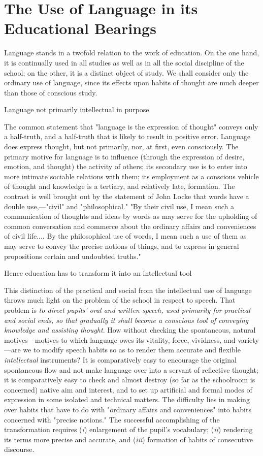 \documentclass[letterpaper]{book}
\begin{document}
\section{The Use of Language in its Educational Bearings}

Language stands in a twofold relation to the work of education. On the
one hand, it is continually used in all studies as well as in all the
social discipline of the school; on the other, it is a distinct object
of study. We shall consider only the ordinary use of language, since its
effects upon habits of thought are much deeper than those of conscious
study.

Language not primarily intellectual in purpose

The common statement that "language is the
expression
of thought" conveys only a half-truth, and a half-truth that is likely
to result in positive error. Language does express thought, but not
primarily, nor, at first, even consciously. The primary motive for
language is to influence (through the expression of desire, emotion, and
thought) the activity of others; its secondary use is to enter into more
intimate sociable relations with them; its employment as a conscious
vehicle of thought and knowledge is a tertiary, and relatively late,
formation. The contrast is well brought out by the statement of John
Locke that words have a double use,---"civil" and "philosophical." "By
their civil use, I mean such a communication of thoughts and ideas by
words as may serve for the upholding of common conversation and commerce
about the ordinary affairs and conveniences of civil life.... By the
philosophical use of words, I mean such a use of them as may serve to
convey the precise notions of things, and to express in general
propositions certain and undoubted truths."

Hence education has to transform it into an intellectual tool

This distinction of the practical and social from the intellectual use
of language throws much light on the problem of the school in respect to
speech. That problem is \emph{to direct pupils' oral and written speech,
used primarily for practical and social ends, so that gradually it shall
become a conscious tool of conveying knowledge and assisting thought}.
How without checking the spontaneous, natural motives---motives to which
language owes its vitality, force, vividness, and variety---are we to
modify speech habits so as to render them accurate and flexible
\emph{intellectual} instruments? It is comparatively easy to encourage
the original spontaneous flow and not make language over into a servant
of reflective thought; it is comparatively easy to check
and
almost destroy (so far as the schoolroom is concerned) native aim and
interest, and to set up artificial and formal modes of expression in
some isolated and technical matters. The difficulty lies in making over
habits that have to do with "ordinary affairs and conveniences" into
habits concerned with "precise notions." The successful accomplishing of
the transformation requires (\emph{i}) enlargement of the pupil's
vocabulary; (\emph{ii}) rendering its terms more precise and accurate,
and (\emph{iii}) formation of habits of consecutive discourse.
\end{document}
